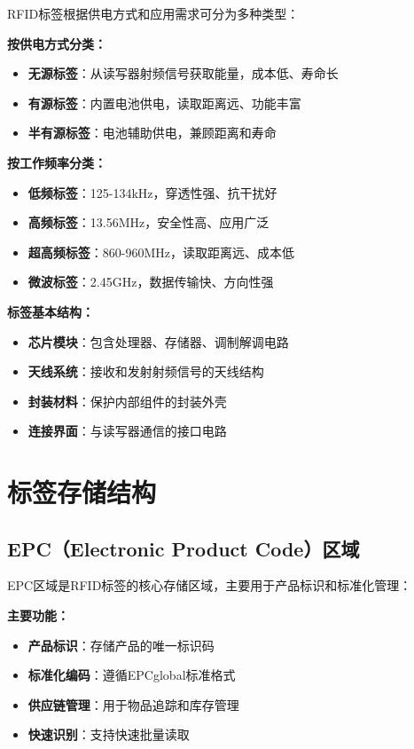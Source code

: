 \documentclass[12pt,UTF8]{ctexbook}
\begin{document}
\begin{itemize}[leftmargin=3.5em]
\begin{itemize}[leftmargin=3.5em]
RFID标签根据供电方式和应用需求可分为多种类型：

\textbf{按供电方式分类：}
\begin{itemize}[leftmargin=3.5em]
    \item \textbf{无源标签}：从读写器射频信号获取能量，成本低、寿命长
    \item \textbf{有源标签}：内置电池供电，读取距离远、功能丰富
    \item \textbf{半有源标签}：电池辅助供电，兼顾距离和寿命
\end{itemize}

\textbf{按工作频率分类：}
\begin{itemize}[leftmargin=3.5em]
    \item \textbf{低频标签}：125-134kHz，穿透性强、抗干扰好
    \item \textbf{高频标签}：13.56MHz，安全性高、应用广泛
    \item \textbf{超高频标签}：860-960MHz，读取距离远、成本低
    \item \textbf{微波标签}：2.45GHz，数据传输快、方向性强
\end{itemize}

\textbf{标签基本结构：}
\begin{itemize}[leftmargin=3.5em]
    \item \textbf{芯片模块}：包含处理器、存储器、调制解调电路
    \item \textbf{天线系统}：接收和发射射频信号的天线结构
    \item \textbf{封装材料}：保护内部组件的封装外壳
    \item \textbf{连接界面}：与读写器通信的接口电路
\end{itemize}

\section{标签存储结构}

\subsection{EPC（Electronic Product Code）区域}

EPC区域是RFID标签的核心存储区域，主要用于产品标识和标准化管理：

\textbf{主要功能：}
\begin{itemize}[leftmargin=3.5em]
    \item \textbf{产品标识}：存储产品的唯一标识码
    \item \textbf{标准化编码}：遵循EPCglobal标准格式
    \item \textbf{供应链管理}：用于物品追踪和库存管理
    \item \textbf{快速识别}：支持快速批量读取
\end{itemize}


\end{itemize}
\end{itemize}
\end{document}
